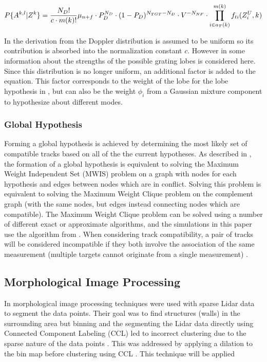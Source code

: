 \documentclass[journal]{IEEEtran}
\begin{document}
\begin{dmath*} \label{eq:hypothesisprobabilitysimp}
    P\{A^{k,l}|Z^{k}\} = \penalty0
    \frac{N_{D}!}{c \cdot m(k)!} \penalty0
    \mu_{n+f} \penalty0
    \cdot P^{N_D}_D \penalty0
    \cdot (1 - P_D)^{N_{TGT}-N_{D}} \penalty0
    \cdot V^{-N_{NF}} \penalty0
    \cdot { \prod_{i \in a_{T}(k)}^{m(k)} f_{ti}(Z_i^U,k) }
\end{dmath*}

In the derivation from \cite{li2013multitarget} the Doppler distribution is assumed to be uniform so its contribution is absorbed into the normalization constant $c$. However in \cite{yamada2017multi} some information about the strengths of the possible grating lobes is considered here. Since this distribution is no longer uniform, an additional factor is added to the equation. This factor corresponds to the weight of the lobe for the lobe hypothesis in \cite{yamada2017multi}, but can also be the weight $\phi_i$ from a Gaussian mixture component to hypothesize about different modes.

\subsubsection{Global Hypothesis}
Forming a global hypothesis is achieved by determining the most likely set of compatible tracks based on all of the the current hypotheses. As described in \cite{kim2015multiple}, the formation of a global hypothesis is equivalent to solving the Maximum Weight Independent Set (MWIS) problem on a graph with nodes for each hypothesis and edges between nodes which are in conflict. Solving this problem is equivalent to solving the Maximum Weight Clique problem on the complement graph (with the same nodes, but edges instead connecting nodes which are compatible). The Maximum Weight Clique problem can be solved using a number of different exact or approximate algorithms, and the simulations in this paper use the algorithm from \cite{ostergaard2001new}. When considering track compatibility, a pair of tracks will be considered incompatible if they both involve the association of the same measurement (multiple targets cannot originate from a single measurement) \cite{kim2015multiple,li2013multitarget,yamada2017multi}.

\subsection{Morphological Image Processing} \label{morphological}
In \cite{ravankar2015connected} morphological image processing techniques were used with sparse Lidar data to segment the data points. Their goal was to find structures (walls) in the surrounding area but binning and the segmenting the Lidar data directly using Connected Component Labeling (CCL) led to incorrect clustering due to the sparse nature of the data points \cite{ravankar2015connected}. This was addressed by applying a dilation to the bin map before clustering using CCL \cite{ravankar2015connected}. This technique will be applied
\end{document}
